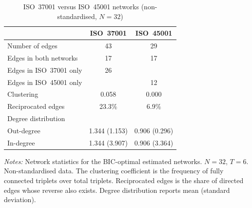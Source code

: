 \documentclass{article}
\begin{document}
\pagestyle{empty}
\begin{table}[htbp]
\centering
\caption{ISO~37001 versus ISO~45001 networks (non-standardised, $N=32$)}
\label{tab:networks_nonstd}
\begin{tabular}{lcc}
\hline\hline
 & ISO~37001 & ISO~45001 \\
\hline
Number of edges & 43 & 29 \\
Edges in both networks & 17 & 17 \\
Edges in ISO~37001 only & 26 & \\
Edges in ISO~45001 only & & 12 \\
Clustering & 0.058 & 0.000 \\
Reciprocated edges & 23.3\% & 6.9\% \\
Degree distribution & & \\
\quad Out-degree & 1.344 (1.153) & 0.906 (0.296) \\
\quad In-degree & 1.344 (3.907) & 0.906 (3.364) \\
\hline\hline
\end{tabular}
\begin{minipage}{0.85\textwidth}
\vspace{4pt}
\footnotesize \textit{Notes:} Network statistics for the BIC-optimal estimated networks. $N=32$, $T=6$. Non-standardised data. The clustering coefficient is the frequency of fully connected triplets over total triplets. Reciprocated edges is the share of directed edges whose reverse also exists. Degree distribution reports mean (standard deviation).
\end{minipage}
\end{table}
\end{document}
